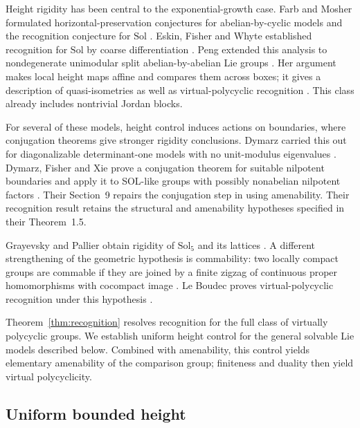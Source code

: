 Height rigidity has been central to the exponential-growth case.
Farb and Mosher formulated horizontal-preservation conjectures for
abelian-by-cyclic models and the recognition conjecture for
$\mathrm{Sol}$ \cite[Section~5]{FarbMosher2000}.
Eskin, Fisher and Whyte established recognition for $\mathrm{Sol}$
by coarse differentiation \cite[Theorem~1.1]{EskinFisherWhyte2013}.
Peng extended this analysis to nondegenerate unimodular split
abelian-by-abelian Lie groups \cite{Peng2011I,Peng2011II}.
Her argument makes local height maps affine and compares them across
boxes; it gives a description of quasi-isometries as well as
virtual-polycyclic recognition
\cite[Theorem~5.3.6 and Corollary~5.3.9]{Peng2011II}.
This class already includes nontrivial Jordan blocks.

For several of these models, height control induces actions on
boundaries, where conjugation theorems give stronger rigidity
conclusions.
Dymarz carried this out for diagonalizable determinant-one models
with no unit-modulus eigenvalues \cite{Dymarz2010}.
Dymarz, Fisher and Xie prove a conjugation theorem for suitable
nilpotent boundaries and apply it to SOL-like groups with possibly
nonabelian nilpotent factors
\cite[Theorems~1.2 and~1.5]{DymarzFisherXie2025}.
Their Section~9 repairs the conjugation step in
\cite[Section~3.3]{Dymarz2010} using amenability. Their recognition
result retains the structural and amenability hypotheses specified
in their Theorem~1.5.

Grayevsky and Pallier obtain rigidity of $\mathrm{Sol}_5$ and its
lattices \cite[Theorem~C]{GrayevskyPallier2025}.
A different strengthening of the geometric hypothesis is commability:
two locally compact groups are commable if they are joined by a finite
zigzag of continuous proper homomorphisms with cocompact image
\cite[Remark~4.C.13]{CornulierDeLaHarpe2016}.
Le Boudec proves virtual-polycyclic recognition under this hypothesis
\cite[Theorem~7 and Corollary~3.7]{LeBoudec2025}.

Theorem~\ref{thm:recognition} resolves recognition for the full class
of virtually polycyclic groups. We establish uniform height control
for the general solvable Lie models described below. Combined with
amenability, this control yields elementary amenability of the
comparison group; finiteness and duality then yield virtual polycyclicity.

\subsection{Uniform bounded height}

